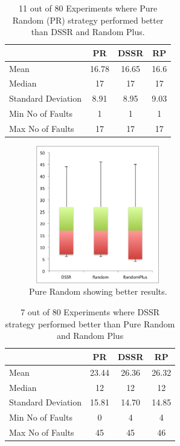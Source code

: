 \documentclass[conference]{IEEEtran}
\begin{document}
\begin{table}[H]
\caption{11 out of 80 Experiments where Pure Random (PR) strategy performed better than DSSR and Random Plus.}
\centering
\begin{tabular}{|l|c|c|c|}
\hline\hline
 				& PR			&  DSSR 			& RP \\[1ex]
\hline
Mean  			&    16.78		&  16.65			&  16.6\\
Median 			&    17    		&  17				&  17 \\
Standard Deviation 	&    8.91		&  8.95			&  9.03\\
Min No of Faults	&    1			&  1				&  1\\
Max No of Faults 	&    17		&  17				& 17\\
\hline
\end{tabular}
\label{table:result1}
\end{table}

\begin{figure}[ht]
\centering
\includegraphics[width=6cm,height=6cm]{RandomBetter.png}
\caption{Pure Random showing better results.}
\label{fig:Result1}
\end{figure}



\begin{table}[H]
\caption{7 out of 80 Experiments where DSSR strategy performed better than Pure Random and Random Plus}
\centering
\begin{tabular}{|l|c|c|c|}
\hline\hline
 				& PR			&  DSSR 			& RP \\[1ex]
\hline
Mean  			&    23.44		&  26.36			&  26.32\\
Median 			&    12 		&  12 			&  12 \\
Standard Deviation 	&    15.81		&  14.70			&  14.85\\
Min No of Faults	&    0			&  4				&  4\\
Max No of Faults 	&    45		&  45				&  46\\
\hline
\end{tabular}
\label{table:result2}
\end{table}
\end{document}

